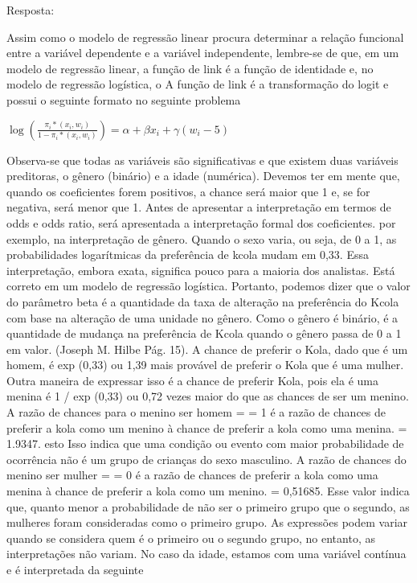 \documentclass[]{article}
\begin{document}
Resposta:

Assim como o modelo de regressão linear procura determinar a relação
funcional entre a variável dependente e a variável independente,
lembre-se de que, em um modelo de regressão linear, a função de link é a
função de identidade e, no modelo de regressão logística, o A função de
link é a transformação do logit e possui o seguinte formato no seguinte
problema

\(\log(\frac{\pi_{i}*(x_{i}, w_{i})}{1-\pi_{i}*(x_{i}, w_{i})}) = \alpha + \beta x_{i} + \gamma(w_{i} - 5)\)

Observa-se que todas as variáveis são significativas e que existem duas
variáveis preditoras, o gênero (binário) e a idade (numérica). Devemos
ter em mente que, quando os coeficientes forem positivos, a chance será
maior que 1 e, se for negativa, será menor que 1. Antes de apresentar a
interpretação em termos de odds e odds ratio, será apresentada a
interpretação formal dos coeficientes. por exemplo, na interpretação de
gênero. Quando o sexo varia, ou seja, de 0 a 1, as probabilidades
logarítmicas da preferência de kcola mudam em 0,33. Essa interpretação,
embora exata, significa pouco para a maioria dos analistas. Está correto
em um modelo de regressão logística. Portanto, podemos dizer que o valor
do parâmetro beta é a quantidade da taxa de alteração na preferência do
Kcola com base na alteração de uma unidade no gênero. Como o gênero é
binário, é a quantidade de mudança na preferência de Kcola quando o
gênero passa de 0 a 1 em valor. (Joseph M. Hilbe Pág. 15). A chance de
preferir o Kola, dado que é um homem, é exp (0,33) ou 1,39 mais provável
de preferir o Kola que é uma mulher. Outra maneira de expressar isso é a
chance de preferir Kola, pois ela é uma menina é 1 / exp (0,33) ou 0,72
vezes maior do que as chances de ser um menino. A razão de chances para
o menino ser homem = = 1 é a razão de chances de preferir a kola como um
menino à chance de preferir a kola como uma menina. = 1.9347. esto Isso
indica que uma condição ou evento com maior probabilidade de ocorrência
não é um grupo de crianças do sexo masculino. A razão de chances do
menino ser mulher = = 0 é a razão de chances de preferir a kola como uma
menina à chance de preferir a kola como um menino. = 0,51685. Esse valor
indica que, quanto menor a probabilidade de não ser o primeiro grupo que
o segundo, as mulheres foram consideradas como o primeiro grupo. As
expressões podem variar quando se considera quem é o primeiro ou o
segundo grupo, no entanto, as interpretações não variam. No caso da
idade, estamos com uma variável contínua e é interpretada da seguinte
\end{document}
